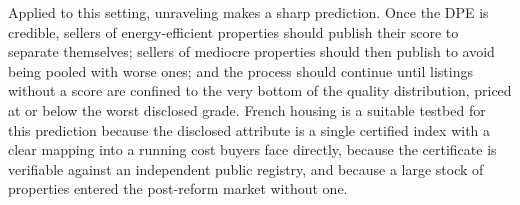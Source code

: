 Applied to this setting, unraveling makes a sharp prediction. Once the DPE is credible, sellers
of energy-efficient properties should publish their score to separate themselves; sellers of
mediocre properties should then publish to avoid being pooled with worse ones; and the process
should continue until listings without a score are confined to the very bottom of the quality
distribution, priced at or below the worst disclosed grade. French housing is a suitable
testbed for this prediction because the disclosed attribute is a single certified index with a
clear mapping into a running cost buyers face directly, because the certificate is verifiable
against an independent public registry, and because a large stock of properties entered the
post-reform market without one.
